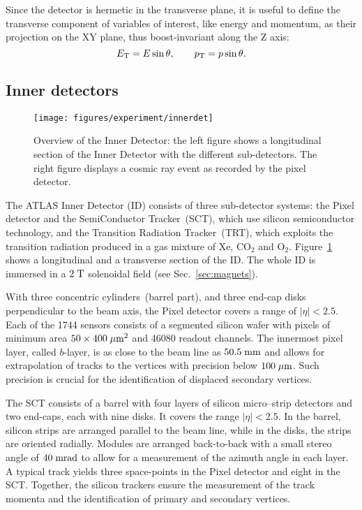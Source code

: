Since the detector is hermetic in the transverse plane, it is useful
to define the transverse component of variables of interest,  
like energy and momentum, as their projection on the XY plane, thus
boost-invariant along the Z axis:
\begin{equation}\label{eq:transv}
\mbox{\ensuremath{E_{\mathrm{T}}}} = E\sin\theta, \qquad p_{\mathrm{T}} = p\sin\theta.
	\end{equation}

\subsection{Inner detectors}
\label{sec:ID}

\begin{figure}[ht]
\centering
\texttt{[image: figures/experiment/innerdet]}
\caption[Overview of the Inner Detector]{
  Overview of the Inner Detector: 
  the left figure shows a longitudinal section of the Inner Detector
  with the different sub-detectors.
  The right figure displays a cosmic ray event as recorded by the
  pixel detector.}
\label{fig:ID}
\end{figure}

The ATLAS Inner Detector (ID) consists of three sub-detector systems:
the Pixel detector and the SemiConductor Tracker~(SCT), which use
silicon semiconductor technology, and the Transition Radiation
Tracker~(TRT), which exploits the transition radiation produced in a
gas mixture of Xe, CO$_2$ and O$_2$.
Figure~\ref{fig:ID} shows a longitudinal and a transverse section of
the ID. The whole ID is immersed in a \mbox{$2 \; \mathrm{T}$} solenoidal field
(see Sec.~\ref{sec:magnets}).

With three concentric cylinders~(barrel part), and three end-cap disks
perpendicular to the beam axis, the Pixel detector covers a range of
\mbox{$|\eta| < 2.5$}.
Each of the 1744 sensors consists of a segmented silicon wafer with
pixels of minimum area \mbox{$50 \times 400 \; \mu\mathrm{m}^2$} and 46080 readout
channels. The innermost pixel layer, called $b$-layer, is as close to
the beam line as \mbox{$50.5 \; \mathrm{mm}$} and allows for extrapolation of
tracks to the vertices with precision below \mbox{$100 \; \mu\mathrm{m}$}.
Such precision is crucial for the identification of displaced
secondary vertices.

The SCT consists of a barrel with four layers of silicon micro--strip
detectors and two end-caps, each with nine disks. It covers the range
\mbox{$|\eta| < 2.5$}. In the barrel, silicon strips are arranged
parallel to the beam line, while in the disks, the strips are oriented radially.
Modules are arranged back-to-back with a small stereo angle of
\mbox{$40 \; \mathrm{mrad}$} to allow for a measurement of the azimuth angle in
each layer. A typical track yields three space-points in the Pixel
detector and eight in the SCT. Together, the silicon trackers ensure
the measurement of the track momenta and the identification of primary
and secondary vertices. 

